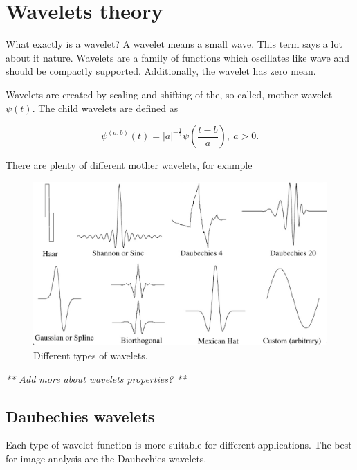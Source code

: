 \chapter{Wavelets theory}
What exactly is a wavelet? A wavelet means a small wave. This term says a lot about it nature. Wavelets are a family of functions which oscillates like wave and should be compactly supported. Additionally, the wavelet has zero mean.

\begin{defn}
Wavelets are created by scaling and shifting of the, so called, mother wavelet $\psi(t)$. The child wavelets are defined as

\begin{equation}
\label{eq:wavelets}
\psi^{(a,b)}(t)=|a|^{-\frac{1}{2}} \psi\left(\frac{t-b}{a}\right),\ a>0. 
\end{equation}

\end{defn}


There are plenty of different mother wavelets, for example

\begin{figure}[h]
	\centering
	\includegraphics[width=\textwidth]{wavelets_with_bottom_line.png}
	\caption{Different types of wavelets.}
	\label{fig:wavelets}
\end{figure}

\textit{** Add more about wavelets properties? **}


\section{Daubechies wavelets}

Each type of wavelet function is more suitable for different applications. The best for image analysis are the Daubechies wavelets. 

